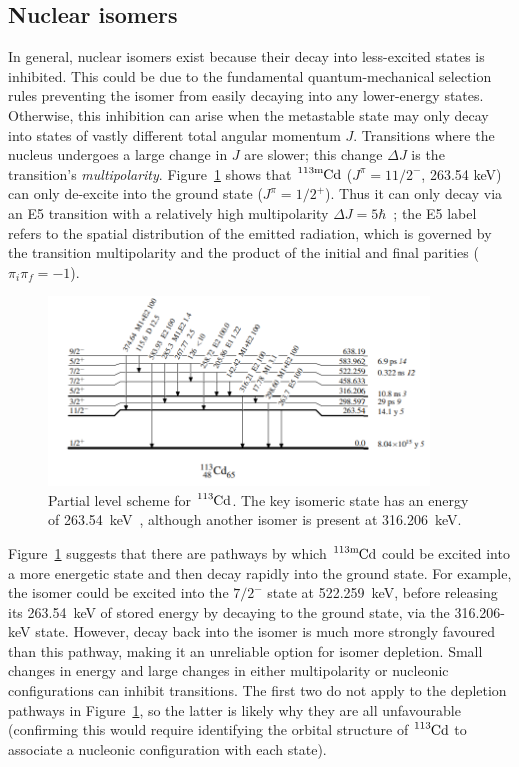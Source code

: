 \documentclass[12pt,a4paper]{article}
\newcommand{\cdm}{\ce{^{113\text{m}}Cd}}
\begin{document}
\subsection*{Nuclear isomers}
In general, nuclear isomers exist because their decay into less-excited states is inhibited.
This could be due to the fundamental quantum-mechanical selection rules preventing the isomer from easily decaying into any lower-energy states.
Otherwise, this inhibition can arise when the metastable state may only decay into states of vastly different total angular momentum $J$.
Transitions where the nucleus undergoes a large change in $J$ are slower; this change $\Delta J$ is the transition's \textit{multipolarity}.
Figure~\ref{fig:cd113} shows that $\cdm$ ($J^\pi = 11/2^-$, 263.54 keV) can only de-excite into the ground state ($J^\pi = 1/2^+$).
Thus it can only decay via an E5 transition with a relatively high multipolarity $\Delta J = 5\hbar$~\cite{blachot_notitle_111}; the E5 label refers to the spatial distribution of the emitted radiation,  which is governed by the transition multipolarity and the product of the initial and final parities ($\pi_i\pi_f = -1$).
\begin{figure}[htbp]
	\centering
	\includegraphics[width=0.9\textwidth]{113cd_partial_level_scheme_ENSDF.png}
	\caption{Partial level scheme for $\ce{^{113}Cd}$. The key isomeric state has an energy of 263.54~keV~\cite{blachot_notitle_111}, although another isomer is present at 316.206~keV.}
\label{fig:cd113}
\end{figure}

\medskip
\noindent
Figure~\ref{fig:cd113} suggests that there are pathways by which $\cdm$ could be excited into a more energetic state and then decay rapidly into the ground state.
For example, the isomer could be excited into the $7/2^-$ state at 522.259~keV, before releasing its 263.54~keV of stored energy by decaying to the ground state, via the 316.206-keV state.
However, decay back into the isomer is much more strongly favoured than this pathway, making it an unreliable option for isomer depletion.
Small changes in energy and large changes in either multipolarity or nucleonic configurations can inhibit transitions.
The first two do not apply to the depletion pathways in Figure~\ref{fig:cd113}, so the latter is likely why they are all unfavourable (confirming this would require identifying the orbital structure of $\ce{^{113}Cd}$ to associate  a nucleonic configuration with each state). %
\end{document}
